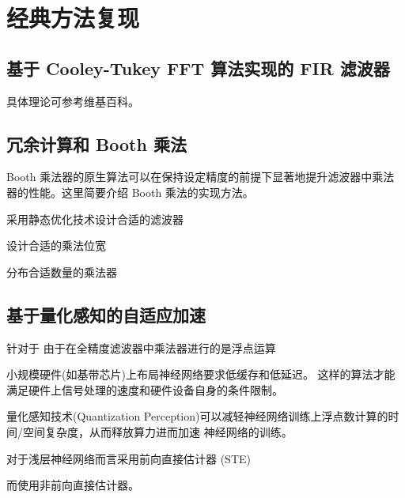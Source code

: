 \section{经典方法复现}

\subsection{基于 Cooley-Tukey FFT 算法实现的 FIR 滤波器}

具体理论可参考维基百科。


\subsection{冗余计算和 Booth 乘法}

Booth 乘法器的原生算法可以在保持设定精度的前提下显著地提升滤波器中乘法器的性能。这里简要介绍 Booth 乘法的实现方法。


采用静态优化技术设计合适的滤波器

设计合适的乘法位宽


分布合适数量的乘法器

\subsection{基于量化感知的自适应加速}

针对于
由于在全精度滤波器中乘法器进行的是浮点运算

小规模硬件(如基带芯片)上布局神经网络要求低缓存和低延迟。
这样的算法才能满足硬件上信号处理的速度和硬件设备自身的条件限制。

量化感知技术(Quantization Perception)可以减轻神经网络训练上浮点数计算的时间/空间复杂度，从而释放算力进而加速
神经网络的训练。

对于浅层神经网络而言采用前向直接估计器 (STE)

而使用非前向直接估计器。

